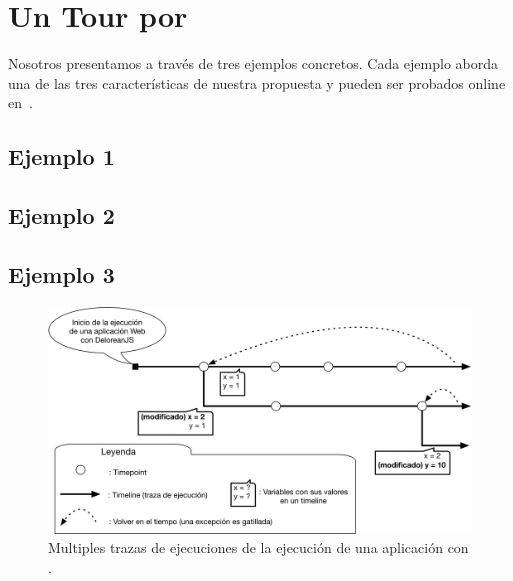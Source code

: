\documentclass[conference]{IEEEtran}
\begin{document}
\section{Un Tour por \deloreanjs}
\label{sec:tour}

Nosotros presentamos \deloreanjs a trav\'es de tres ejemplos concretos. Cada ejemplo aborda una de las tres caracter\'isticas de nuestra propuesta y pueden ser probados online en~\cite{deloreanjs}.     



\subsection{Ejemplo 1}
\label{sec:tour1}


\subsection{Ejemplo 2}
\label{sec:tour2}


\subsection{Ejemplo 3}
\label{sec:tour3}


\bigskip

\begin{figure}[t]
\begin{center}
\includegraphics[width=.7\linewidth]{fig-timeline}
\caption{Multiples trazas de ejecuciones de la ejecuci\'on de una aplicaci\'on con \deloreanjs.}
\label{fig:timeline}
\end{center}
\end{figure}
\end{document}
